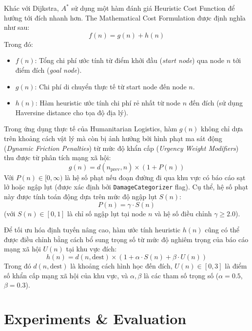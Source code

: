 \documentclass[12pt,a4paper]{article}
\begin{document}
\begin{itemize}
Khác với Dijkstra, $A^*$ sử dụng một hàm đánh giá Heuristic Cost Function để hướng tới đích nhanh hơn. The Mathematical Cost Formulation được định nghĩa như sau:
\begin{equation}
f(n) = g(n) + h(n)
\end{equation}
Trong đó:
\begin{itemize}
    \item $f(n)$: Tổng chi phí ước tính từ điểm khởi đầu (\textit{start node}) qua node $n$ tới điểm đích (\textit{goal node}).
    \item $g(n)$: Chi phí di chuyển thực tế từ start node đến node $n$.
    \item $h(n)$: Hàm heuristic ước tính chi phí rẻ nhất từ node $n$ đến đích (sử dụng Haversine distance cho tọa độ địa lý).
\end{itemize}

Trong ứng dụng thực tế của Humanitarian Logistics, hàm $g(n)$ không chỉ dựa trên khoảng cách vật lý mà còn bị ảnh hưởng bởi hình phạt ma sát động (\textit{Dynamic Friction Penalties}) từ mức độ khẩn cấp (\textit{Urgency Weight Modifiers}) thu được từ phân tích mạng xã hội:
\begin{equation}
g(n) = d(n_{\text{prev}}, n) \times (1 + P(n))
\end{equation}
Với $P(n) \in [0, \infty)$ là hệ số phạt nếu đoạn đường đi qua khu vực có báo cáo sạt lở hoặc ngập lụt (được xác định bởi \texttt{DamageCategorizer} flag). Cụ thể, hệ số phạt này được tính toán động dựa trên mức độ ngập lụt $S(n)$:
\begin{equation}
P(n) = \gamma \cdot S(n)
\end{equation}
(với $S(n) \in [0, 1]$ là chỉ số ngập lụt tại node $n$ và hệ số điều chỉnh $\gamma \ge 2.0$).

Để tối ưu hóa định tuyến nâng cao, hàm ước tính heuristic $h(n)$ cũng có thể được điều chỉnh bằng cách bổ sung trọng số từ mức độ nghiêm trọng của báo cáo mạng xã hội $U(n)$ tại khu vực đích:
\begin{equation}
h(n) = d(n, \text{dest}) \times \left(1 + \alpha \cdot S(n) + \beta \cdot U(n)\right)
\end{equation}
Trong đó $d(n, \text{dest})$ là khoảng cách hình học đến đích, $U(n) \in [0, 3]$ là điểm số khẩn cấp mạng xã hội của khu vực, và $\alpha, \beta$ là các tham số trọng số ($\alpha = 0.5$, $\beta = 0.3$).

\newpage

\section{Experiments \& Evaluation}


\end{itemize}
\end{document}
